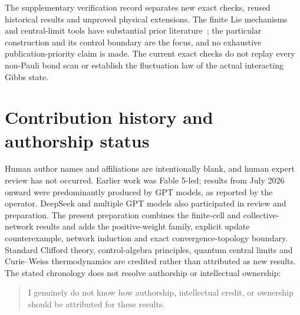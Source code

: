 \documentclass[11pt]{article}
\theoremstyle{remark}\newtheorem{remark}[theorem]{Remark}
\begin{document}
The supplementary verification record separates new exact checks, reused historical results and unproved physical extensions.
The finite Lie mechanisms and central-limit tools have substantial prior literature~\cite{Cuypers2026,Burgarth2009,Goderis1989}; the particular construction and its control boundary are the focus, and no exhaustive publication-priority claim is made.
The current exact checks do not replay every non-Pauli bond scan or establish the fluctuation law of the actual interacting Gibbs state.

\section*{Contribution history and authorship status}
Human author names and affiliations are intentionally blank, and human expert review has not occurred.
Earlier work was Fable 5-led; results from July 2026 onward were predominantly produced by GPT models, as reported by the operator.
DeepSeek and multiple GPT models also participated in review and preparation.
The present preparation combines the finite-cell and collective-network results and adds the positive-weight family, explicit update counterexample, network induction and exact convergence-topology boundary.
Standard Clifford theory, control-algebra principles, quantum central limits and Curie--Weiss thermodynamics are credited rather than attributed as new results.
The stated chronology does not resolve authorship or intellectual ownership:
\begin{quote}
I genuinely do not know how authorship, intellectual credit, or ownership should be attributed for these results.
\end{quote}


\end{document}
